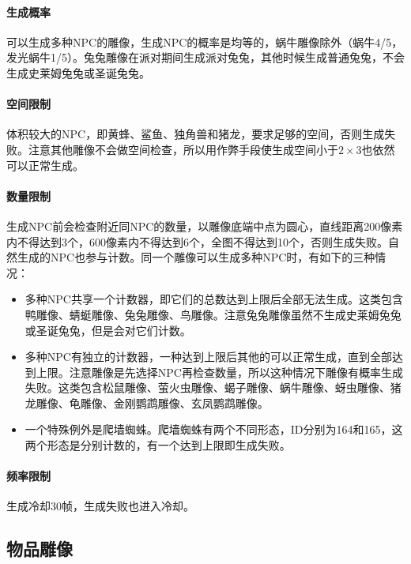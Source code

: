 \paragraph{生成概率}可以生成多种NPC的雕像，生成NPC的概率是均等的，蜗牛雕像除外（蜗牛4/5，发光蜗牛1/5）。兔兔雕像在派对期间生成派对兔兔，其他时候生成普通兔兔，不会生成史莱姆兔兔或圣诞兔兔。

\paragraph{空间限制}体积较大的NPC，即黄蜂、鲨鱼、独角兽和猪龙，要求足够的空间，否则生成失败。注意其他雕像不会做空间检查，所以用作弊手段使生成空间小于$2\times 3$也依然可以正常生成。

\paragraph{数量限制}生成NPC前会检查附近同NPC的数量，以雕像底端中点为圆心，直线距离200像素内不得达到3个，600像素内不得达到6个，全图不得达到10个，否则生成失败。自然生成的NPC也参与计数。同一个雕像可以生成多种NPC时，有如下的三种情况：
\begin{itemize}
  \item 多种NPC共享一个计数器，即它们的总数达到上限后全部无法生成。这类包含鸭雕像、蜻蜓雕像、兔兔雕像、鸟雕像。注意兔兔雕像虽然不生成史莱姆兔兔或圣诞兔兔，但是会对它们计数。
  \item 多种NPC有独立的计数器，一种达到上限后其他的可以正常生成，直到全部达到上限。注意雕像是先选择NPC再检查数量，所以这种情况下雕像有概率生成失败。这类包含松鼠雕像、萤火虫雕像、蝎子雕像、蜗牛雕像、蚜虫雕像、猪龙雕像、龟雕像、金刚鹦鹉雕像、玄凤鹦鹉雕像。
  \item 一个特殊例外是爬墙蜘蛛。爬墙蜘蛛有两个不同形态，ID分别为164和165，这两个形态是分别计数的，有一个达到上限即生成失败。
\end{itemize}

\paragraph{频率限制}生成冷却30帧，生成失败也进入冷却。

\subsection{物品雕像}\label{sec:itemstatue}
\begin{center}
  \quad
  \quad
\end{center}


